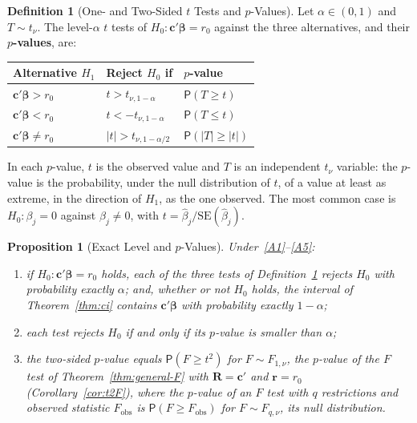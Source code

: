 \documentclass[14pt]{extarticle}
\theoremstyle{plain}
\newtheorem{proposition}[theorem]{Proposition}
\theoremstyle{definition}
\newtheorem{definition}[theorem]{Definition}
\theoremstyle{remark}
\newcommand\prb{\mathsf{P}}
\newcommand{\SE}{\mathrm{SE}}
\def\bb{\boldsymbol{\beta}}
\newcommand{\bR}{\mathbf{R}}
\newcommand{\br}{\mathbf{r}}
\def\bc{\mathbf{c}}
\begin{document}
\begin{definition}[One- and Two-Sided $t$ Tests and $p$-Values]\label{def:t-tests}
Let $\alpha \in (0, 1)$ and $T \sim t_\nu$. The level-$\alpha$ $t$ tests of $H_0\colon \bc'\bb = r_0$ against the three alternatives, and their \textbf{$p$-values}, are:
\begin{center}
\begin{tabular}{@{}lll@{}}
\toprule
Alternative $H_1$ & Reject $H_0$ if & $p$-value\\
\midrule
$\bc'\bb > r_0$ & $t > t_{\nu,1-\alpha}$ & $\prb(T \geqslant t)$\\
$\bc'\bb < r_0$ & $t < -t_{\nu,1-\alpha}$ & $\prb(T \leqslant t)$\\
$\bc'\bb \neq r_0$ & $|t| > t_{\nu,1-\alpha/2}$ & $\prb(|T| \geqslant |t|)$\\
\bottomrule
\end{tabular}
\end{center}
In each $p$-value, $t$ is the observed value and $T$ is an independent $t_\nu$ variable: the $p$-value is the probability, under the null distribution of $t$, of a value at least as extreme, in the direction of $H_1$, as the one observed. The most common case is $H_0\colon \beta_j = 0$ against $\beta_j \neq 0$, with $t = \hat\beta_j/\SE(\hat\beta_j)$.
\end{definition}

\begin{proposition}[Exact Level and $p$-Values]\label{prop:t-pvalue}
Under~\ref{A1}--\ref{A5}:
\begin{enumerate}[label=\textup{(\roman*)}]
\item if $H_0\colon \bc'\bb = r_0$ holds, each of the three tests of Definition~\ref{def:t-tests} rejects $H_0$ with probability exactly $\alpha$; and, whether or not $H_0$ holds, the interval of Theorem~\ref{thm:ci} contains $\bc'\bb$ with probability exactly $1 - \alpha$;
\item each test rejects $H_0$ if and only if its $p$-value is smaller than $\alpha$;
\item the two-sided $p$-value equals $\prb(F \geqslant t^2)$ for $F \sim F_{1,\nu}$, the $p$-value of the $F$ test of Theorem~\ref{thm:general-F} with $\bR = \bc'$ and $\br = r_0$ (Corollary~\ref{cor:t2F}), where the $p$-value of an $F$ test with $q$ restrictions and observed statistic $F_{\mathrm{obs}}$ is $\prb(F \geqslant F_{\mathrm{obs}})$ for $F \sim F_{q,\nu}$, its null distribution.
\end{enumerate}
\end{proposition}
\end{document}

